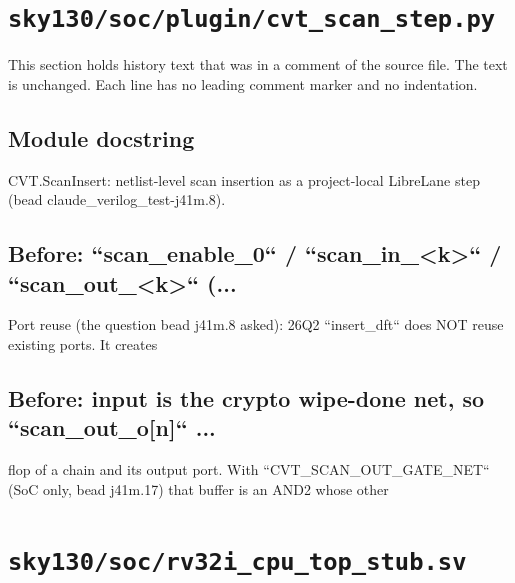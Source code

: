 \section{\texttt{sky130/soc/plugin/cvt\_scan\_step.py}}\label{cr:pd:sky130-soc-plugin-cvt-scan-step-py}

This section holds history text that was in a comment of the source file. The text is unchanged. Each line has no leading comment marker and no indentation.

\begin{record}

\subsection*{Module docstring}

\begin{textblock}
CVT.ScanInsert: netlist-level scan insertion as a project-local LibreLane step (bead claude_verilog_test-j41m.8).
\end{textblock}

\subsection*{Before: ``scan\_enable\_0`` / ``scan\_in\_<k>`` / ``scan\_out\_<k>`` (...}

\begin{textblock}
Port reuse (the question bead j41m.8 asked): 26Q2 ``insert_dft`` does NOT reuse existing ports.  It creates
\end{textblock}

\subsection*{Before: input is the crypto wipe-done net, so ``scan\_out\_o[n]`` ...}

\begin{textblock}
flop of a chain and its output port.  With ``CVT_SCAN_OUT_GATE_NET`` (SoC only, bead j41m.17) that buffer is an AND2 whose other
\end{textblock}

\end{record}

\section{\texttt{sky130/soc/rv32i\_cpu\_top\_stub.sv}}\label{cr:pd:sky130-soc-rv32i-cpu-top-stub-sv}

